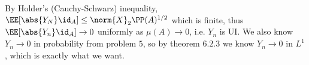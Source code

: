 \documentclass[11pt, headheight=30pt]{scrartcl}
\begin{document}
By Holder's (Cauchy-Schwarz) inequality, $\EE[\abs{Y_N}\id_A]\leq \norm{X}_2 \PP(A)^{1/2}$
which is finite, thus $\EE[\abs{Y_n}\id_A]\to 0$ uniformly as $\mu(A)\to 0$,
i.e. $Y_n$ is UI. We also know $Y_n\to 0$ in probability from problem $5$, so
by theorem $6.2.3$ we know $Y_n\to 0$ in $L^1$, which is exactly what we want.







\end{document}
